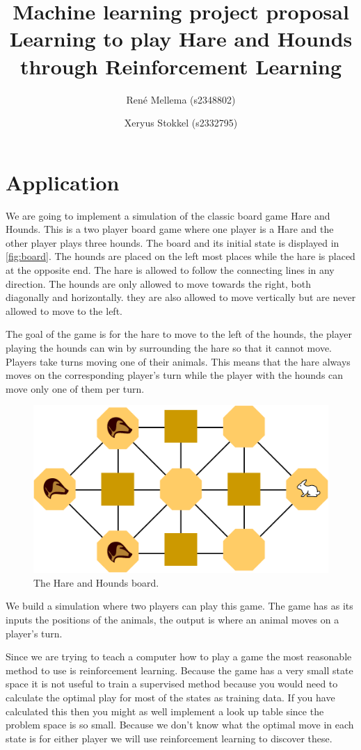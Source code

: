 \documentclass[a4paper]{article}
\title{Machine learning project proposal \\
	Learning to play Hare and Hounds through Reinforcement Learning}
\author{Ren\'e Mellema (s2348802) \and Xeryus Stokkel (s2332795)}
\begin{document}
\maketitle

\section{Application}
We are going to implement a simulation of the classic board game Hare and
Hounds. This is a two player board game where one player is a Hare and the
other player plays three hounds. The board and its initial state is displayed
in \autoref{fig:board}. The hounds are placed on the left most places while the
hare is placed at the opposite end. The hare is allowed to follow the
connecting lines in any direction. The hounds are only allowed to move towards
the right, both diagonally and horizontally. they are also allowed to move
vertically but are never allowed to move to the left.

The goal of the game is for the hare to move to the left of the hounds, the
player playing the hounds can win by surrounding the hare so that it cannot
move. Players take turns moving one of their animals. This means that the hare
always moves on the corresponding player's turn while the player with the
hounds can move only one of them per turn.

\begin{figure}
	\centering
	\includegraphics[width=.7\textwidth]{Hare_and_Hounds_board}
	\caption{The Hare and Hounds board.}
	\label{fig:board}
\end{figure}

We build a simulation where two players can play this game. The game has as
its inputs the positions of the animals, the output is where an animal moves
on a player's turn.

Since we are trying to teach a computer how to play a game the most reasonable
method to use is reinforcement learning. Because the game has a very small
state space it is not useful to train a supervised method because you would
need to calculate the optimal play for most of the states as training data.
If you have calculated this then you might as well implement a look up table
since the problem space is so small. Because we don't know what the optimal
move in each state is for either player we will use reinforcement learning
to discover these.
\end{document}
